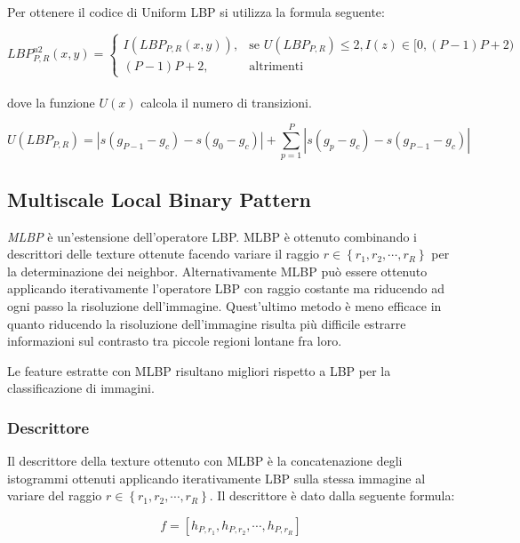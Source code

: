 Per ottenere il codice di Uniform \acs{LBP} si utilizza la formula seguente:

\begin{equation}
LBP_{P,R}^{u2}(x, y)=	
\begin{cases} 
I(LBP_{P,R}(x, y)), & \mbox{se } U(LBP_{P,R}) \le 2, I(z) \in [0, (P-1)P+2 )   \\
(P-1)P+2, & \mbox{altrimenti}
\end{cases}
\end{equation} \\

\noindent dove la funzione $U(x)$ calcola il numero di transizioni.

\begin{equation}
U(LBP_{P,R}) = |s( g_{P-1} - g_{c}) - s(g_{0} - g_{c}) | + \sum_{p = 1}^{P} |s(g_{p} - g_{c}) - s( g_{P-1} - g_{c}) |
\end{equation}

\subsection{Multiscale Local Binary Pattern}
\textit{\acf{MLBP}} è un'estensione dell'operatore \acs{LBP}. \acs{MLBP} è ottenuto combinando i descrittori delle texture ottenute facendo variare il raggio $r \in \left\lbrace  r_1, r_2, \cdots, r_R \right\rbrace$ per la determinazione dei neighbor.
Alternativamente \acs{MLBP} può essere ottenuto applicando iterativamente l'operatore \acs{LBP} con raggio costante ma riducendo ad ogni passo la risoluzione dell'immagine. Quest'ultimo metodo è meno efficace in quanto riducendo la risoluzione dell'immagine risulta più difficile estrarre informazioni sul contrasto tra piccole regioni lontane fra loro.

Le feature estratte con \acs{MLBP} risultano migliori rispetto a \acs{LBP} per la classificazione di immagini\cite{Chan-PHD}.

\subsubsection{Descrittore}
\label{mlbp:desc-mlbp}
Il descrittore della texture ottenuto con \acs{MLBP} è la concatenazione degli istogrammi ottenuti applicando iterativamente \acs{LBP} sulla stessa immagine al variare del raggio $r \in \left\lbrace  r_1, r_2, \cdots, r_R \right\rbrace$. Il descrittore è dato dalla seguente formula:

\begin{equation}
\label{mlbp:eq-descriptor}
f = [h_{P, r_{1}}, h_{P, r_{2}}, \cdots, h_{P, r_R}]
\end{equation}


